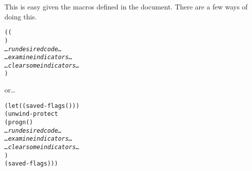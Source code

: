 \documentclass[../Example-Program.tex]{subfiles}
\begin{document}
This is easy given the macros defined in the document.  There are a
few ways of doing this.

\begin{alltt}
    ( (
                )
       \textit{\ldots run desired code \ldots}
       \textit{\ldots examine indicators \ldots}
       \textit{\ldots clear some indicators \ldots}
       )
\end{alltt}
or\ldots
\begin{alltt}
    (let ((saved-flags ()))
       (unwind-protect
           (progn ()
                  \textit{\ldots run desired code \ldots}
                  \textit{\ldots examine indicators \ldots}
                  \textit{\ldots clear some indicators \ldots}
                  )
         ( saved-flags)))
\end{alltt}
\end{document}
